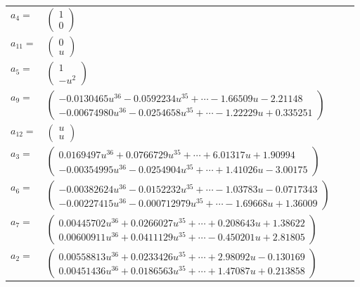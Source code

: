 \documentclass[1p]{elsarticle_modified}
\theoremstyle{definition}
\begin{document}
\begin{tabular}{m{7pt} m{180pt} m{7pt} m{180pt} }
\flushright $a_{4}=$&$\begin{pmatrix}1\\0\end{pmatrix}$ \\
\flushright $a_{11}=$&$\begin{pmatrix}0\\u\end{pmatrix}$ \\
\flushright $a_{5}=$&$\begin{pmatrix}1\\- u^2\end{pmatrix}$ \\
\flushright $a_{9}=$&$\begin{pmatrix}-0.0130465 u^{36}-0.0592234 u^{35}+\cdots-1.66509 u-2.21148\\-0.00674980 u^{36}-0.0254658 u^{35}+\cdots-1.22229 u+0.335251\end{pmatrix}$ \\
\flushright $a_{12}=$&$\begin{pmatrix}u\\u\end{pmatrix}$ \\
\flushright $a_{3}=$&$\begin{pmatrix}0.0169497 u^{36}+0.0766729 u^{35}+\cdots+6.01317 u+1.90994\\-0.00354995 u^{36}-0.0254904 u^{35}+\cdots+1.41026 u-3.00175\end{pmatrix}$ \\
\flushright $a_{6}=$&$\begin{pmatrix}-0.00382624 u^{36}-0.0152232 u^{35}+\cdots-1.03783 u-0.0717343\\-0.00227415 u^{36}-0.000712979 u^{35}+\cdots-1.69668 u+1.36009\end{pmatrix}$ \\
\flushright $a_{7}=$&$\begin{pmatrix}0.00445702 u^{36}+0.0266027 u^{35}+\cdots+0.208643 u+1.38622\\0.00600911 u^{36}+0.0411129 u^{35}+\cdots-0.450201 u+2.81805\end{pmatrix}$ \\
\flushright $a_{2}=$&$\begin{pmatrix}0.00558813 u^{36}+0.0233426 u^{35}+\cdots+2.98092 u-0.130169\\0.00451436 u^{36}+0.0186563 u^{35}+\cdots+1.47087 u+0.213858\end{pmatrix}$ \\

\end{tabular}
\end{document}

